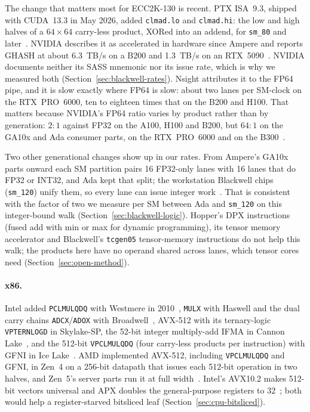 The change that matters most for ECC2K-130 is recent. PTX ISA~9.3,
shipped with CUDA~13.3 in May 2026, added \texttt{clmad.lo} and
\texttt{clmad.hi}: the low and high halves of a $64\times64$ carry-less
product, XORed into an addend, for \texttt{sm\_80} and
later~\cite{nvidia_ptx93}. NVIDIA describes it as accelerated in hardware
since Ampere and reports GHASH at about 6.3~TB/s on a B200 and 1.3~TB/s
on an RTX~5090~\cite{watson2026clmad}. NVIDIA documents neither its SASS
mnemonic nor its issue rate, which is why we measured both
(Section~\ref{sec:blackwell-rates}). Nsight attributes it to the FP64
pipe, and it is slow exactly where FP64 is slow: about two lanes per
SM-clock on the RTX~PRO~6000, ten to eighteen times that on the B200 and
H100. That matters because
NVIDIA's FP64 ratio varies by product rather than by generation: $2{:}1$
against FP32 on the A100, H100 and B200, but $64{:}1$ on the GA10x and Ada
consumer parts, on the RTX~PRO~6000 and on the
B300~\cite{nvidia_ga102_wp,nvidia_ada_wp,nvidia_h100_wp,nvidia_rtx_blackwell_wp,aubrey2025blackwellultra}.

Two other generational changes show up in our rates. From Ampere's GA10x
parts onward each SM partition pairs 16 FP32-only lanes with 16 lanes that
do FP32 or INT32, and Ada kept that split; the workstation Blackwell
chips (\texttt{sm\_120}) unify them, so every lane can issue integer
work~\cite{nvidia_ga102_wp,nvidia_ada_wp,nvidia_rtx_blackwell_wp}. That is
consistent with the factor of two we measure per SM between Ada and
\texttt{sm\_120} on this integer-bound walk (Section~\ref{sec:blackwell-logic}).
Hopper's DPX instructions (fused add with min or max for dynamic
programming), its tensor memory accelerator and Blackwell's
\texttt{tcgen05} tensor-memory instructions do not help this walk; the
products here have no operand shared across lanes, which tensor cores
need (Section~\ref{sec:open-method}).

\paragraph{x86.} Intel added \texttt{PCLMULQDQ} with Westmere in
2010~\cite{gueron2014clmul}, \texttt{MULX} with Haswell and the dual carry
chains \texttt{ADCX}/\texttt{ADOX} with Broadwell~\cite{ozturk2012adx},
AVX-512 with its ternary-logic \texttt{VPTERNLOGD} in Skylake-SP, the
52-bit integer multiply-add IFMA in Cannon Lake~\cite{gueron2016ifma}, and
the 512-bit \texttt{VPCLMULQDQ} (four carry-less products per instruction)
with GFNI in Ice Lake~\cite{intel_sdm_vol1,drucker2018vpclmulqdq}. AMD
implemented AVX-512, including \texttt{VPCLMULQDQ} and GFNI, in Zen~4 on a
256-bit datapath that issues each 512-bit operation in two halves, and
Zen~5's server parts run it at full width~\cite{amd_58003,amd_epyc5_wp}.
Intel's AVX10.2 makes 512-bit vectors universal and APX doubles the
general-purpose registers to 32~\cite{intel_avx102,intel_apx}; both would
help a register-starved bitsliced leaf (Section~\ref{sec:cpu-bitsliced}).

